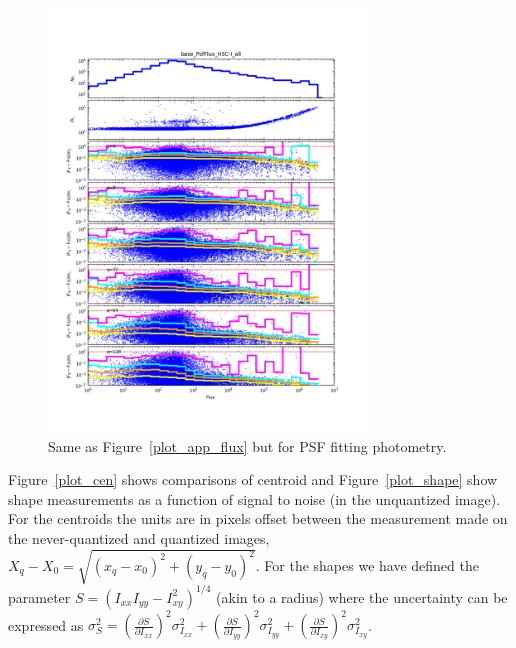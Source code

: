 \begin{figure}
\centering
\includegraphics[width=0.75\textwidth]{figure/rplot_all_base_PsfFlux_HSC-I.png}
\caption{Same as Figure~\ref{plot_app_flux} but for PSF fitting photometry.}
\label{plot_psf_flux}
\end{figure}


Figure~\ref{plot_cen} shows comparisons of centroid and Figure~\ref{plot_shape} show shape measurements as a function of signal to noise 
(in the unquantized image).  For the centroids the units are in pixels offset between the measurement made on the 
never-quantized and quantized images, $X_q-X_0 = \sqrt{ (x_q-x_0)^2 + (y_q-y_0)^2}$.  
For the shapes we have defined the parameter $S=(I_{xx} I_{yy} - I_{xy}^2)^{1/4}$ (akin to a radius) 
where the uncertainty can be expressed as $\sigma_S^2 = (\frac{\partial S}{\partial I_{xx}})^2 \sigma_{I_{xx}}^2 + 
(\frac{\partial S}{\partial I_{yy}})^2 \sigma_{I_{yy}}^2 + (\frac{\partial S}{\partial I_{xy}})^2 \sigma_{I_{xy}}^2$.

